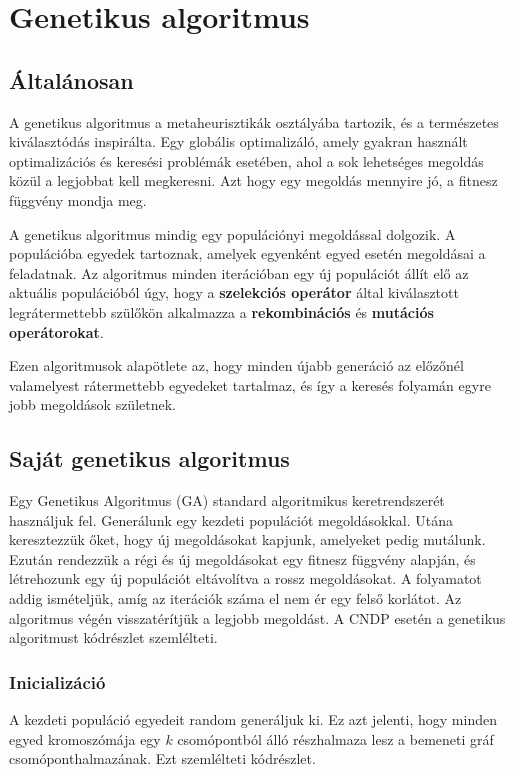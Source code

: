 \section{Genetikus algoritmus}\label{sec:GENETIKUS_ALGORITMUS}


\subsection{Általánosan}
A genetikus algoritmus a metaheurisztikák osztályába tartozik, és a természetes kiválasztódás inspirálta.
Egy globális optimalizáló, amely gyakran használt optimalizációs és keresési problémák esetében,
ahol a sok lehetséges megoldás közül a legjobbat kell megkeresni.
Azt hogy egy megoldás mennyire jó, a fitnesz függvény mondja meg.

A genetikus algoritmus mindig egy populációnyi megoldással dolgozik.
A populációba egyedek tartoznak, amelyek egyenként  egyed esetén megoldásai a feladatnak.
Az algoritmus minden iterációban egy új populációt állít elő az aktuális populációból úgy,
hogy a \textbf{szelekciós operátor} által kiválasztott legrátermettebb szülőkön alkalmazza a
\textbf{rekombinációs} és \textbf{mutációs operátorokat}.

Ezen algoritmusok alapötlete az, hogy minden újabb generáció
az előzőnél valamelyest rátermettebb egyedeket tartalmaz, és így a keresés folyamán
egyre jobb megoldások születnek.


\subsection{Saját genetikus algoritmus}
Egy Genetikus Algoritmus (GA) standard algoritmikus keretrendszerét használjuk fel.
Generálunk egy kezdeti populációt megoldásokkal. Utána keresztezzük őket, hogy új megoldásokat kapjunk,
amelyeket pedig mutálunk. Ezután rendezzük a régi és új megoldásokat egy fitnesz függvény alapján,
és létrehozunk egy új populációt eltávolítva a rossz megoldásokat.
A folyamatot addig ismételjük, amíg az iterációk száma el nem ér egy felső korlátot.
Az algoritmus végén visszatérítjük a legjobb megoldást.
A CNDP esetén a genetikus algoritmust  kódrészlet szemlélteti.



\subsubsection{Inicializáció}
A kezdeti populáció egyedeit random generáljuk ki.
Ez azt jelenti, hogy minden egyed kromoszómája egy $k$ csomópontból álló részhalmaza lesz a bemeneti gráf csomóponthalmazának.
Ezt szemlélteti  kódrészlet.


